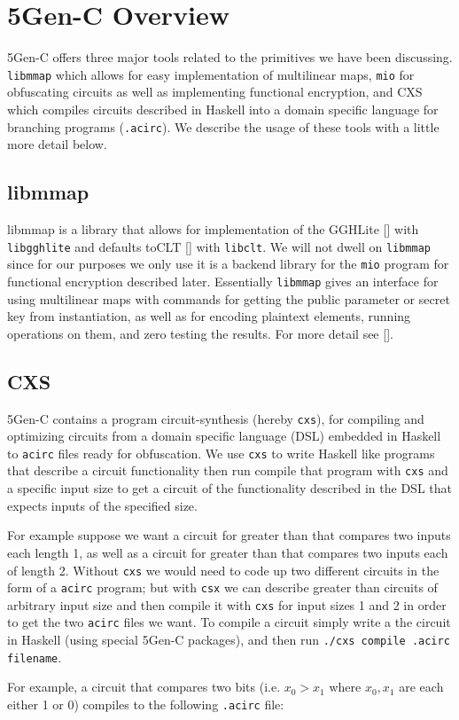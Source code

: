 \documentclass[12pt,twoside]{reedthesis}
\begin{document}
      
    \section{5Gen-C Overview}
    5Gen-C offers three major tools related to the primitives we have been discussing. \texttt{libmmap} which allows for easy implementation of multilinear maps, \texttt{mio} for obfuscating circuits as well as implementing functional encryption, and CXS which compiles circuits described in Haskell into a domain specific language for branching programs (\texttt{.acirc}). We describe the usage of these tools with a little more detail below.
    
    \subsection{libmmap}
    libmmap is a library that allows for implementation of the GGHLite [\cite{GGHLite}] with \texttt{libgghlite} and defaults toCLT [\cite{CLT13}] with \texttt{libclt}. We will not dwell on \texttt{libmmap} since for our purposes we only use it is a backend library for the \texttt{mio} program for functional encryption described later. Essentially \texttt{libmmap} gives an interface for using multilinear maps with commands for getting the public parameter or secret key from instantiation, as well as for encoding plaintext elements, running operations on them, and zero testing the results. For more detail see [\cite{5genc}].
    
      
   \subsection{CXS}
   
   5Gen-C contains a program circuit-synthesis (hereby \texttt{cxs}), for compiling and optimizing circuits from a domain specific language (DSL) embedded in Haskell to \texttt{acirc} files ready for obfuscation. We use \texttt{cxs} to write Haskell like programs that describe a circuit functionality then run compile that program with \texttt{cxs} and a specific input size to get a circuit of the functionality described in the DSL that expects inputs of the specified size.
   \par For example suppose we want a circuit for greater than that compares two inputs each length 1, as well as a circuit for greater than that compares two inputs each of length 2. Without \texttt{cxs} we would need to code up two different circuits in the form of a \texttt{acirc} program; but with \texttt{csx} we can describe greater than circuits of arbitrary input size and then compile it with \texttt{cxs} for input sizes 1 and 2 in order to get the two \texttt{acirc} files we want. To compile a circuit simply write a the circuit in Haskell (using special 5Gen-C packages), and then run \texttt{./cxs compile .acirc filename}.
   \par For example, a circuit that compares two bits (i.e. $x_0 > x_1$ where $x_0,x_1$ are each either 1 or 0) compiles to the following \texttt{.acirc} file:
   
\end{document}

